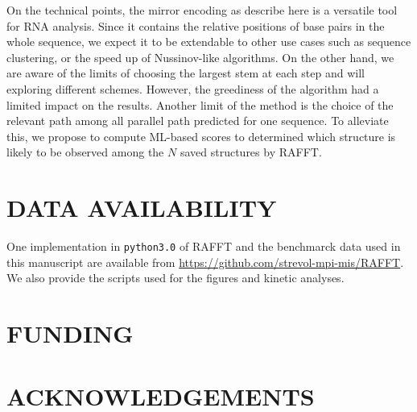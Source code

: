 \documentclass[a4paper,12pt]{article}
\begin{document}
On the technical points, the mirror encoding as describe here is a versatile
tool for RNA analysis. Since it contains the relative positions of base pairs in
the whole sequence, we expect it to be extendable to other use cases such as
sequence clustering, or the speed up of Nussinov-like algorithms. On the other
hand, we are aware of the limits of choosing the largest stem at each step and
will exploring different schemes. However, the greediness of the algorithm had a
limited impact on the results. Another limit of the method is the choice of the
relevant path among all parallel path predicted for one sequence. To alleviate
this, we propose to compute ML-based scores to determined which structure is
likely to be observed among the \(N\) saved structures by RAFFT.

\section*{DATA AVAILABILITY}
\label{sec:org95f7fbb}
One implementation in \texttt{python3.0} of RAFFT and the benchmarck data used in this
manuscript are available from \url{https://github.com/strevol-mpi-mis/RAFFT}. We also
provide the scripts used for the figures and kinetic analyses.

\section*{FUNDING}
\label{sec:orgc13f55b}
\section*{ACKNOWLEDGEMENTS}
\label{sec:orgbb01ba4}



\end{document}
